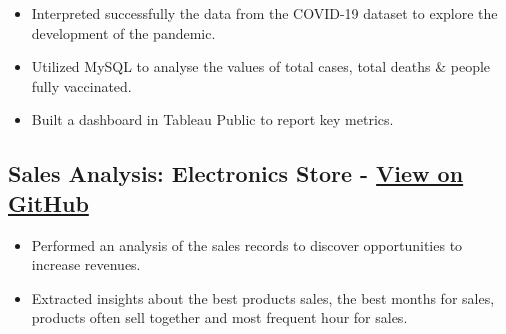 \documentclass[5pt]{article} %
\begin{document}
\begin{itemize}
\itemsep0em
\item Interpreted successfully the data from the COVID-19 dataset to explore the development of the pandemic.
\item Utilized MySQL to analyse the values of total cases, total deaths \& people fully vaccinated. 
\item Built a dashboard in Tableau Public to report key metrics.
\end{itemize}



%
%
\subsection*{Sales Analysis: Electronics Store - \href{https://dquerales.github.io/DanielPortfolio/sales_analysis.html}{View on GitHub}}

\begin{itemize}
\itemsep0em
\item Performed an analysis of the sales records to discover opportunities to increase revenues.
\item Extracted insights about the best products sales, the best months for sales, products often sell together and most frequent hour for sales.
\end{itemize}
\end{document}
